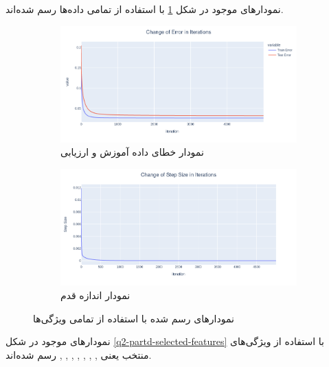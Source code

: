 \documentclass[14pt,a4]{article}
\begin{document}
نمودار‌های موجود در شکل \ref{q2-partd-all-features} با استفاده از تمامی داده‌ها رسم شده‌اند.

\begin{figure}[h]
    \centering
     \begin{subfigure}{0.45\linewidth}
         \centering
         \includegraphics[width=\textwidth]{images/implementation/q2/part_d/all_features_error.png}
         \caption{نمودار خطای داده آموزش و ارزیابی}
     \end{subfigure}
     \hfill
     \begin{subfigure}{0.45\textwidth}
         \centering
         \includegraphics[width=\textwidth]{images/implementation/q2/part_d/all_features_step_size.png}
         \caption{نمودار اندازه قدم}
     \end{subfigure}
     \caption{نمودار‌های رسم شده با استفاده از تمامی ویژگی‌ها}
     \label{q2-partd-all-features}
\end{figure}

نمودار‌های موجود در شکل \ref{q2-partd-selected-features} با استفاده از ویژگی‌های منتخب یعنی
, , , , , , , 
رسم شده‌اند.
\end{document}
